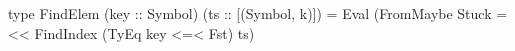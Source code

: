 \begin{code}
type FindElem (key :: Symbol) (ts :: [(Symbol, k)]) =
  Eval (FromMaybe Stuck
    =<< FindIndex (TyEq key <=< Fst) ts)
\end{code}
